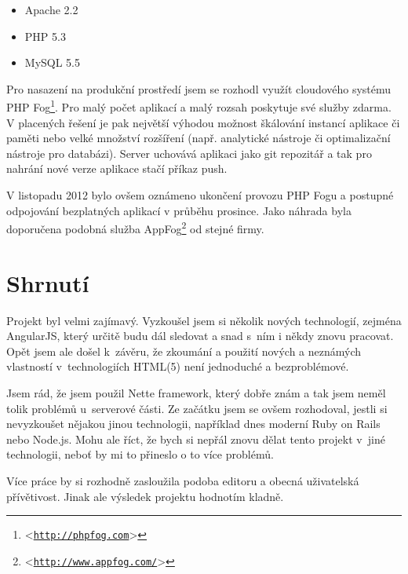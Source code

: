 \documentclass[11pt,twoside,a4paper]{book}
\let\oldUrl\url									%
\renewcommand\url[1]{<\texttt{\oldUrl{#1}}>}
\begin{document}
\begin{itemize}
	\item Apache 2.2
	\item PHP 5.3
	\item MySQL 5.5
\end{itemize}

Pro nasazení na produkční prostředí jsem se rozhodl využít cloudového systému PHP Fog\footnote{\url{http://phpfog.com}}. Pro malý počet aplikací a malý rozsah poskytuje své služby zdarma. V placených řešení je pak největší výhodou možnost škálování instancí aplikace či paměti nebo velké množství rozšíření (např. analytické nástroje či optimalizační nástroje pro databázi). Server uchovává aplikaci jako git repozitář a tak pro nahrání nové verze aplikace stačí příkaz push.

V listopadu 2012 bylo ovšem oznámeno ukončení provozu PHP Fogu a postupné odpojování bezplatných aplikací v průběhu prosince. Jako náhrada byla doporučena podobná služba AppFog\footnote{\url{http://www.appfog.com/}} od stejné firmy.



\chapter{Shrnutí}
Projekt byl velmi zajímavý. Vyzkoušel jsem si několik nových technologií, zejména AngularJS, který určitě budu dál sledovat a snad s~ním i někdy znovu pracovat. Opět jsem ale došel k~závěru, že zkoumání a použití nových a neznámých vlastností v~technologiích HTML(5) není jednoduché a bezproblémové.

Jsem rád, že jsem použil Nette framework, který dobře znám a tak jsem neměl tolik problémů u~serverové části. Ze začátku jsem se ovšem rozhodoval, jestli si nevyzkoušet nějakou jinou technologii, například dnes moderní Ruby on Rails nebo Node.js. Mohu ale říct, že bych si nepřál znovu dělat tento projekt v~jiné technologii, neboť by mi to přineslo o to více problémů.

Více práce by si rozhodně zasloužila podoba editoru a obecná uživatelská přívětivost. Jinak ale výsledek projektu hodnotím kladně.

{}

\end{document}
